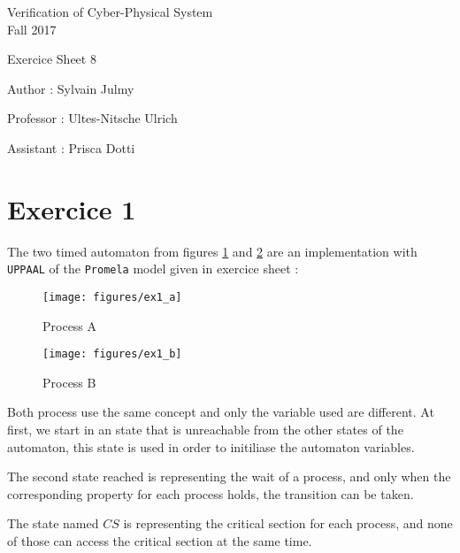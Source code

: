 \documentclass[a4paper,11pt]{report}
\author{Sylvain Julmy}
\date{\today}
\begin{document}
\begin{center}
  \Large{
    Verification of Cyber-Physical System\\
    Fall 2017
  }
  
  \noindent\makebox[\linewidth]{\rule{\linewidth}{0.4pt}}
  Exercice Sheet 8

  \vspace*{1.4cm}

  Author : Sylvain Julmy
  \noindent\makebox[\linewidth]{\rule{\linewidth}{0.4pt}}

  \begin{flushleft}
    Professor : Ultes-Nitsche Ulrich
    
    Assistant : Prisca Dotti
  \end{flushleft}

  \noindent\makebox[\linewidth]{\rule{\textwidth}{1pt}}
\end{center}

\section*{Exercice 1}

The two timed automaton from figures \ref{fig:processA} and \ref{fig:processB}
are an implementation with \texttt{UPPAAL} of the \texttt{Promela} model given
in exercice sheet :

\begin{figure}[h]
  \centering
  \texttt{[image: figures/ex1\_a]}
  \caption{Process A}
  \label{fig:processA}
\end{figure}

\begin{figure}[h]
  \centering
  \texttt{[image: figures/ex1\_b]}
  \caption{Process B}
  \label{fig:processB}
\end{figure}

Both process use the same concept and only the variable used are different. At
first, we start in an state that is unreachable from the other states of the
automaton, this state is used in order to initiliase the automaton variables.

The second state reached is representing the wait of a process, and only when
the corresponding property for each process holds, the transition can be taken.

The state named $CS$ is representing the critical section for each process, and
none of those can access the critical section at the same time.
\end{document}

